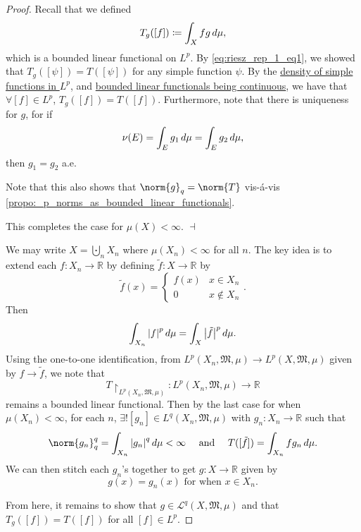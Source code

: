 \documentclass[notoc,notitlepage]{tufte-book}
\begin{document}
\begin{proof}
  \noindent
  Recall that we defined
  \begin{equation*}
    T_g([f]) \coloneqq \int_{X} fg \mathop{}\!d{\mu},
  \end{equation*}
  which is a bounded linear functional on $L^p$.
  By \cref{eq:riesz_rep_1_eq1}, we showed that $T_g([\psi]) = T([\psi])$
  for any simple function $\psi$.
  By the \hyperref[thm:density_of_simple_functions_in_cal_p]{density of simple functions in $L^p$},
  and
  \hyperref[propo:bounded_linear_functionals_are_continuous]{bounded linear
  functionals being continuous},
  we have that $\forall [f] \in L^p$, $T_g([f]) = T([f])$.
  Furthermore, note that there is uniqueness for $g$, for if
  \begin{equation*}
    \nu(E) = \int_{E} g_1 \mathop{}\!d{\mu} = \int_{E} g_2 \mathop{}\!d{\mu},
  \end{equation*}
  then $g_1 = g_2$ a.e.

  Note that this also shows that $\norm{g}_q = \norm{T}$ vis-á-vis
  \cref{propo:_p_norms_as_bounded_linear_functionals}.

  This completes the case for $\mu(X) < \infty$. $\dashv$

  \noindent
  We may write $X = \bigcupdot_n X_n$ where $\mu(X_n) < \infty$ for all $n$.
  The key idea is to extend each $f : X_n \to \mathbb{R}$ by defining
  $\tilde{f} : X \to \mathbb{R}$ by
  \begin{equation*}
    \tilde{f}(x) = \begin{cases}
      f(x) & x \in X_n \\
      0 & x \notin X_n
    \end{cases}.
  \end{equation*}
  Then
  \begin{equation*}
    \int_{X_n} \left|f\right|^p \mathop{}\!d{\mu} = \int_{X} \left|\tilde{f}\right|^p \mathop{}\!d{\mu}.
  \end{equation*}
  Using the one-to-one identification, from $L^p(X_n, \mathfrak{M}, \mu) \to
  L^p(X, \mathfrak{M}, \mu)$ given by $f \to \tilde{f}$,
  we note that
  \begin{equation*}
    T \restriction_{L^p(X_n, \mathfrak{M}, \mu)} : L^p(X_n, \mathfrak{M}, \mu) \to \mathbb{R}
  \end{equation*}
  remains a bounded linear functional.
  Then by the last case for when $\mu(X_n) < \infty$, for each $n$,
  $\exists! [g_n] \in L^q(X_n, \mathfrak{M}, \mu)$ with $g_n : X_n \to \mathbb{R}$
  such that 
  \begin{equation*}
    \norm{g_n}_q^q = \int_{X_n} \abs{g_n}^q \dif{\mu} < \infty \quad\text{ and }\quad
    T([\tilde{f}]) = \int_{X_n} f g_n \dif{\mu}.
  \end{equation*}
  We can then stitch each $g_n$'s together to get $g : X \to \mathbb{R}$
  given by
  \begin{equation*}
    g(x) = g_n(x) \text{ for when } x \in X_n.
  \end{equation*}

  From here, it remains to show that $g \in \mathcal{L}^q(X, \mathfrak{M}, \mu)$
  and that $T_g([f]) = T([f])$ for all $[f] \in L^p$.
\end{proof}
\end{document}
